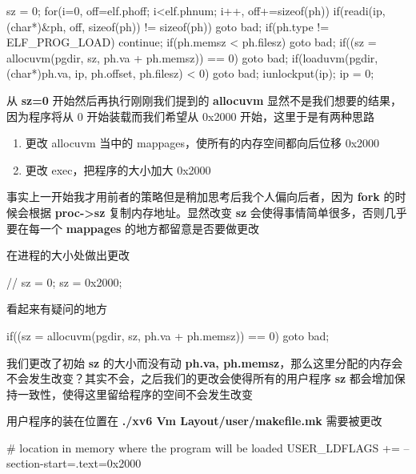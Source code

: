 \begin{ccode}
    sz = 0;
    for(i=0, off=elf.phoff; i<elf.phnum; i++, off+=sizeof(ph)){
        if(readi(ip, (char*)&ph, off, sizeof(ph)) != sizeof(ph))
        goto bad;
        if(ph.type != ELF_PROG_LOAD)
        continue;
        if(ph.memsz < ph.filesz)
        goto bad;
        if((sz = allocuvm(pgdir, sz, ph.va + ph.memsz)) == 0)
        goto bad;
        if(loaduvm(pgdir, (char*)ph.va, ip, ph.offset, ph.filesz) < 0)
        goto bad;
    }
    iunlockput(ip);
    ip = 0;
\end{ccode}



从 \textbf{sz=0} 开始然后再执行刚刚我们提到的 \textbf{allocuvm} 显然不是我们想要的结果，因为程序将从 0 开始装载而我们希望从 0x2000 开始，这里于是有两种思路

\begin{enumerate}
    \item 更改 allocuvm 当中的 mappages，使所有的内存空间都向后位移 0x2000
    \item 更改 exec，把程序的大小加大 0x2000
\end{enumerate}

事实上一开始我才用前者的策略但是稍加思考后我个人偏向后者，因为 \textbf{fork} 的时候会根据 \textbf{proc->sz} 复制内存地址。显然改变 \textbf{sz} 会使得事情简单很多，否则几乎要在每一个 \textbf{mappages} 的地方都留意是否要做更改

在进程的大小处做出更改

\begin{ccode}
    // sz = 0;
    sz = 0x2000;
\end{ccode}

看起来有疑问的地方

\begin{ccode}
    if((sz = allocuvm(pgdir, sz, ph.va + ph.memsz)) == 0)
    goto bad;
\end{ccode}

我们更改了初始 \textbf{sz} 的大小而没有动 \textbf{ph.va, ph.memsz}，那么这里分配的内存会不会发生改变？其实不会，之后我们的更改会使得所有的用户程序 \textbf{sz} 都会增加保持一致性，使得这里留给程序的空间不会发生改变

用户程序的装在位置在 \textbf{./xv6 Vm Layout/user/makefile.mk} 需要被更改

\begin{bashcode}
    # location in memory where the program will be loaded
    USER_LDFLAGS += --section-start=.text=0x2000
\end{bashcode}

